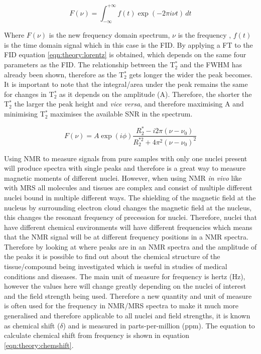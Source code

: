 \begin{equation}
    F(\nu) = \int_{-\infty}^{+\infty} f(t)\exp(-2\pi i \nu t) \, dt
    \label{eqn:theory:fourier}
\end{equation}

Where $F(\nu)$ is the new frequency domain spectrum, $\nu$ is the frequency , $f(t)$ is the time domain signal which in this case is the \ac{FID}. By applying a \ac{FT} to the \ac{FID} equation \ref{eqn:theory:lorentz} is obtained, which depends on the same four parameters as the \ac{FID}. The relationship between the T$_2^*$ and the FWHM has already been shown, therefore as the T$_2^*$ gets longer the wider the peak becomes. It is important to note that the integral/area under the peak remains the same for changes in T$_2^*$ as it depends on the amplitude (A). Therefore, the shorter the T$_2^*$ the larger the peak height and \textit{vice versa}, and therefore maximising A and minimising T$_2^*$ maximises the available \ac{SNR} in the spectrum.

\begin{equation}
    F(\nu) = A\exp(i\phi)\frac{R_2^*-i2\pi(\nu-\nu_0)}{R_2^{*2}+4\pi^2(\nu-\nu_0)^2}
    \label{eqn:theory:lorentz}
\end{equation}

Using \ac{NMR} to measure signals from pure samples with only one nuclei present will produce spectra with single peaks and therefore is a great way to measure magnetic moments of different nuclei. However, when using \ac{NMR} \textit{in vivo} like with \ac{MRS} all molecules and tissues are complex and consist of multiple different nuclei bound in multiple different ways. The shielding of the magnetic field at the nucleus by surrounding electron cloud changes the magnetic field at the nucleus, this changes the resonant frequency of precession for nuclei. Therefore, nuclei that have different chemical environments will have different frequencies which means that the \ac{NMR} signal will be at different frequency positions in a \ac{NMR} spectra. Therefore by looking at where peaks are in an \ac{NMR} spectra and the amplitude of the peaks it is possible to find out about the chemical structure of the tissue/compound being investigated which is useful in studies of medical conditions and diseases. The main unit of measure for frequency is hertz (Hz), however the values here will change greatly depending on the nuclei of interest and the field strength being used. Therefore a new quantity and unit of measure is often used for the frequency in NMR/\ac{MRS} spectra to make it much more generalised and therefore applicable to all nuclei and field strengths, it is known as chemical shift ($\delta$) and is measured in parts-per-million (ppm). The equation to calculate chemical shift from frequency is shown in equation \ref{eqn:theory:chemshift}.

